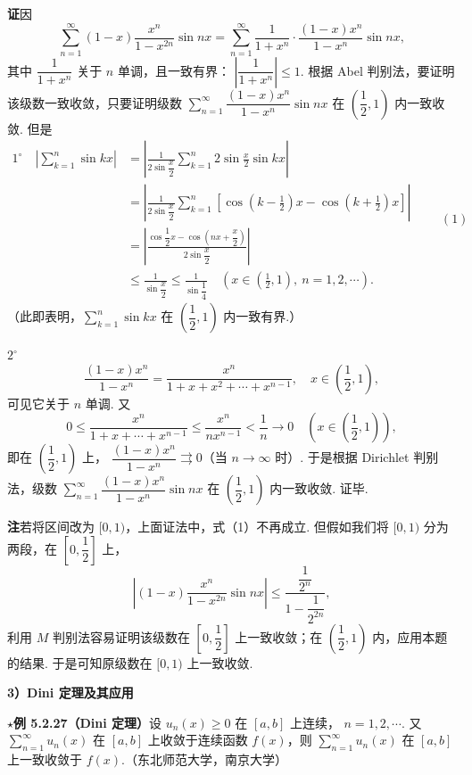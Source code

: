 \documentclass[UTF8,12pt,a4paper,fontset=fandol]{ctexart}
\begin{document}
\noindent\textbf{证}\quad 因
\[
  \sum_{n=1}^{\infty}(1-x)\frac{x^n}{1-x^{2n}}\sin nx
  =\sum_{n=1}^{\infty}\frac1{1+x^n}\cdot\frac{(1-x)x^n}{1-x^n}\sin nx,
\]
其中 $\dfrac1{1+x^n}$ 关于 $n$ 单调，且一致有界：
$\left|\dfrac1{1+x^n}\right|\le1$. 根据 Abel 判别法，要证明该级数一致收敛，只要证明级数
$\displaystyle\sum_{n=1}^{\infty}\dfrac{(1-x)x^n}{1-x^n}\sin nx$
在 $\left(\dfrac12,1\right)$ 内一致收敛. 但是
\[
\begin{aligned}
1^\circ\quad
\left|\sum_{k=1}^{n}\sin kx\right|
&=\left|\frac1{2\sin\dfrac{x}{2}}\sum_{k=1}^{n}2\sin\frac{x}{2}\sin kx\right|\\
&=\left|\frac1{2\sin\dfrac{x}{2}}\sum_{k=1}^{n}\left[\cos\left(k-\frac12\right)x-\cos\left(k+\frac12\right)x\right]\right|\\
&=\left|\frac{\cos\dfrac12x-\cos\left(nx+\dfrac{x}{2}\right)}{2\sin\dfrac{x}{2}}\right|\\
&\le\frac1{\sin\dfrac{x}{2}}\le\frac1{\sin\dfrac14}\quad
\left(x\in\left(\frac12,1\right),\ n=1,2,\cdots\right).
\end{aligned}
\qquad(1)
\]
（此即表明，$\displaystyle\sum_{k=1}^{n}\sin kx$ 在 $\left(\dfrac12,1\right)$ 内一致有界.）

$2^\circ$
\[
  \frac{(1-x)x^n}{1-x^n}
  =\frac{x^n}{1+x+x^2+\cdots+x^{n-1}},\quad x\in\left(\frac12,1\right),
\]
可见它关于 $n$ 单调. 又
\[
  0\le\frac{x^n}{1+x+\cdots+x^{n-1}}
  \le\frac{x^n}{nx^{n-1}}<\frac1n\to0
  \quad\left(x\in\left(\frac12,1\right)\right),
\]
即在 $\left(\dfrac12,1\right)$ 上，
$\dfrac{(1-x)x^n}{1-x^n}\rightrightarrows0$（当 $n\to\infty$ 时）. 于是根据 Dirichlet 判别法，级数
$\displaystyle\sum_{n=1}^{\infty}\dfrac{(1-x)x^n}{1-x^n}\sin nx$
在 $\left(\dfrac12,1\right)$ 内一致收敛. 证毕.

\noindent\textbf{注}\quad 若将区间改为 $[0,1)$，上面证法中，式（1）不再成立. 但假如我们将 $[0,1)$ 分为两段，在
$\left[0,\dfrac12\right]$ 上，
\[
  \left|(1-x)\frac{x^n}{1-x^{2n}}\sin nx\right|
  \le\frac{\dfrac1{2^n}}{1-\dfrac1{2^{2n}}},
\]
利用 $M$ 判别法容易证明该级数在 $\left[0,\dfrac12\right]$ 上一致收敛；在
$\left(\dfrac12,1\right)$ 内，应用本题的结果. 于是可知原级数在 $[0,1)$ 上一致收敛.

\noindent\textbf{3）Dini 定理及其应用}

\noindent\textbf{$\star$例 5.2.27（Dini 定理）}\quad 设 $u_n(x)\ge0$ 在 $[a,b]$ 上连续，
$n=1,2,\cdots$. 又 $\displaystyle\sum_{n=1}^{\infty}u_n(x)$ 在 $[a,b]$ 上收敛于连续函数
$f(x)$，则 $\displaystyle\sum_{n=1}^{\infty}u_n(x)$ 在 $[a,b]$ 上一致收敛于 $f(x)$.（东北师范大学，南京大学）
\end{document}
